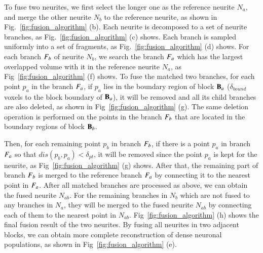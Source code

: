 To fuse two neurites, we first select the longer one as the reference neurite $N_a$, and merge the other neurite $N_b$ to the reference neurite, as shown in Fig.~\ref{fig:fusion_algorithm} (b).
%
Each neurite is decomposed to a set of neurite branches, as Fig.~\ref{fig:fusion_algorithm} (c) shows.
Each branch is sampled uniformly into a set of fragments, as Fig.~\ref{fig:fusion_algorithm} (d) shows.
%
For each branch $F_b$ of neurite $N_b$, we search the branch $F_a$ which has the largest overlapped volume with it in the reference neurite $N_a$, as Fig~\ref{fig:fusion_algorithm} (f) shows.
To fuse the matched two branches, for each point $p_a$ in the branch $F_a$, if $p_a$ lies in the boundary region of block $\mathbf{B}_a$ ($\delta_{bound}$ voxels to the block boundary of $\mathbf{B}_a$), it will be removed and all its child branches are also deleted, as shown in Fig~\ref{fig:fusion_algorithm} (g).  
The same deletion operation is performed on the points in the branch $F_b$ that are located in the boundary regions of block $\mathbf{B}_b$.


Then, for each remaining point $p_b$ in branch $F_b$, if there is a point $p_a$ in branch $F_a$ so that $dis(p_b,p_a)<\delta_{pt}$, it will be removed since the point $p_a$ is kept for the neurite, as Fig~\ref{fig:fusion_algorithm} (g) shows.
%
After that, the remaining part of branch $F_b$ is merged to the reference branch $F_a$ by connecting it to the nearest point in $F_a$.
After all matched branches are processed as above, we can obtain the fused neurite $N_{ab}$.
%
For the remaining branches in $N_b$ which are not fused to any branches in $N_a$, they will be merged to the fused neurite $N_{ab}$ by connecting each of them to the nearest point in $N_{ab}$.
%
Fig~\ref{fig:fusion_algorithm} (h) shows the final fusion result of the two neurites. 
By fusing all neurites in two adjacent blocks, we can obtain more complete reconstruction of dense neuronal populations, as shown in Fig~\ref{fig:fusion_algorithm} (e).


